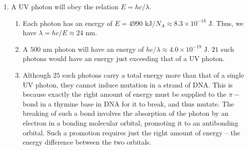 \documentclass[10pt]{article}
\begin{document}
\begin{enumerate}
                \item A UV photon will obey the relation $E = hc/\lambda$.
                \begin{enumerate}
                        \item Each photon has an energy of $E = 4990 \text{ kJ} / N_A \approx 8.3 \times 10^{-18} \text{ J}$.
                        Thus, we have $\lambda = hc/E \approx 24 \text{ nm}$.
                        \item A $500 \text{ nm}$ photon will have an energy of $hc/\lambda \approx 4.0 \times 10^{-19} \text { J}$.
                        $21$ such photons would have an energy just exceeding that of a UV photon.
                        \item Although $25$ such photons carry a total energy more than that of a single UV photon, they cannot
                        induce mutation in a strand of DNA. This is because exactly the right amount of energy must be supplied
                        to the $\pi-$bond in a thymine base in DNA for it to break, and thus mutate. The breaking of such a bond
                        involves the absorption of the photon by an electron in a bonding molecular orbital, promoting it to an antibonding orbital.
                        Such a promotion requires just the right amount of energy -- the energy difference between the two orbitals.
                \end{enumerate}
        \end{enumerate}
\end{document}
